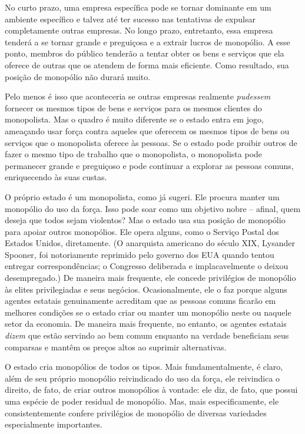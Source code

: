 No curto prazo, uma empresa específica pode se tornar dominante em um ambiente específico e talvez até ter sucesso nas tentativas de expulsar completamente outras empresas. No longo prazo, entretanto, essa empresa tenderá a se tornar grande e preguiçosa e a extrair lucros de monopólio. A esse ponto, membros do público tenderão a tentar obter os bens e serviços que ela oferece de outras que os atendem de forma mais eficiente. Como resultado, sua posição de monopólio não durará muito.

Pelo menos é isso que aconteceria se outras empresas realmente \emph{pudessem} fornecer os mesmos tipos de bens e serviços para os mesmos clientes do monopolista. Mas o quadro é muito diferente se o estado entra em jogo, ameaçando usar força contra aqueles que oferecem os mesmos tipos de bens ou serviços que o monopolista oferece às pessoas. Se o estado pode proibir outros de fazer o mesmo tipo de trabalho que o monopolista, o monopolista pode permanecer grande e preguiçoso e pode continuar a explorar as pessoas comuns, enriquecendo às suas custas.

O próprio estado é um monopolista, como já sugeri. Ele procura manter um monopólio do uso da força. Isso pode soar como um objetivo nobre -- afinal, quem deseja que todos sejam violentos? Mas o estado usa sua posição de monopólio para apoiar outros monopólios. Ele opera alguns, como o Serviço Postal dos Estados Unidos, diretamente. (O anarquista americano do século XIX, Lysander Spooner, foi notoriamente reprimido pelo governo dos EUA quando tentou entregar correspondências; o Congresso deliberada e implacavelmente o deixou desempregado.) De maneira mais frequente, ele concede privilégios de monopólio às elites privilegiadas e seus negócios. Ocasionalmente, ele o faz porque alguns agentes estatais genuinamente acreditam que as pessoas comuns ficarão em melhores condições se o estado criar ou manter um monopólio neste ou naquele setor da economia. De maneira mais frequente, no entanto, os agentes estatais \emph{dizem} que estão servindo ao bem comum enquanto na verdade beneficiam seus comparsas e mantêm os preços altos ao suprimir alternativas.

O estado cria monopólios de todos os tipos. Mais fundamentalmente, é claro, além de seu próprio monopólio reivindicado do uso da força, ele reivindica o direito, de fato, de criar outros monopólios à vontade: ele diz, de fato, que possui uma espécie de poder residual de monopólio. Mas, mais especificamente, ele consistentemente confere privilégios de monopólio de diversas variedades especialmente importantes.

